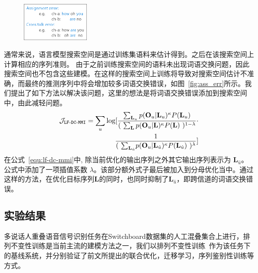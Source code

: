 \begin{figure}[!htp]
  \centering
    \captionstyle{\centering}
    \includegraphics[width=0.3\textwidth]{figure/ass_error.png}
\end{figure}


通常来说，语言模型搜索空间是通过训练集语料来估计得到。之后在该搜索空间上计算相应的序列准则。 
由于之前训练搜索空间的语料未出现词语交换问题，因此搜索空间也不包含这些建模。在这样的搜索空间上训练将导致对搜索空间估计不准确，而最终的推测序列中将会增加较多词语交换错误，如图~\ref{fig:ass_err}所示。我们提出了如下方法以解决该问题，这里的想法是将词语交换错误添加到搜索空间中，由此减轻问题。
\begin{equation}
\label{equ:lf-dc-mmi}
\begin{split}
\mathcal{J}_{\tt{LF\text{-}DC\text{-}MMI}}
=\sum_{u} \log  [ \frac {\sum_{\mathbf{L}_u} p(\mathbf{O}_u|\mathbf{L}_u)^{\kappa}P(\mathbf{L}_u)}{(\ \sum_{\mathbf{L}} p(\mathbf{O}_u|\mathbf{L})^{\kappa}P(\mathbf{L})\ )^{1-\lambda} } 
\cdot \\ 
\frac{1} {(\ {\sum_{\mathbf{L}_{\hat{u}}}} p(\mathbf{O}_u|{\mathbf{L}_{\hat{u}}})^{\kappa}P({\mathbf{L}_{\hat{u}}})\ )^\lambda}
 ]
\end{split}
\end{equation}
在公式~\ref{equ:lf-dc-mmi}中, 除当前优化的输出序列之外其它输出序列表示为 $\mathbf{L}_{\hat{u}}$。公式中添加了一项插值系数 $\lambda$。该部分额外式子最后被加入到分母优化当中。通过这样的方法，在优化目标序列$\mathbf{L}$的同时，也同时抑制了$\mathbf{L}_{\hat{u}}$，即跨信道的词语交换错误。


\subsection{实验结果} %
\label{Sec:exp-pit}

多说话人重叠语音信号识别任务在Switchboard数据集的人工混叠集合上进行，排列不变性训练是当前主流的建模方法之一，我们以排列不变性训练~\cite{yu2017recognizing}作为该任务下的基线系统，并分别验证了前文所提出的联合优化，迁移学习，序列鉴别性训练等方式。

